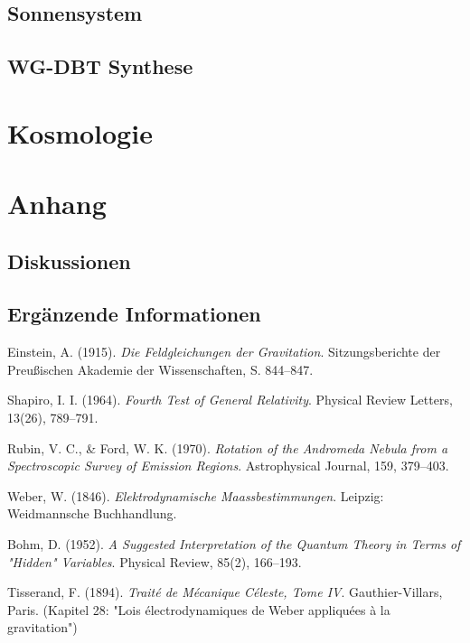 \documentclass{book}
\numberwithin{equation}{section}
\begin{document}
\chapter{Sonnensystem}
\label{chapter:sonnensystem}



\chapter{WG-DBT Synthese}

\part{Kosmologie}



\part{Anhang}
\chapter{Diskussionen}
\label{chapter:diskussion}







\chapter{Ergänzende Informationen}
\label{chapter:information}


\begin{thebibliography}{9}

Einstein, A. (1915). 
\textit{Die Feldgleichungen der Gravitation}. 
Sitzungsberichte der Preußischen Akademie der Wissenschaften, 
S. 844–847.

Shapiro, I. I. (1964). 
\textit{Fourth Test of General Relativity}. 
Physical Review Letters, 13(26), 789–791.

Rubin, V. C., \& Ford, W. K. (1970). 
\textit{Rotation of the Andromeda Nebula from a Spectroscopic Survey of Emission Regions}. 
Astrophysical Journal, 159, 379–403.

Weber, W. (1846). 
\textit{Elektrodynamische Maassbestimmungen}. 
Leipzig: Weidmannsche Buchhandlung.

Bohm, D. (1952). 
\textit{A Suggested Interpretation of the Quantum Theory in Terms of "Hidden" Variables}. 
Physical Review, 85(2), 166–193.

Tisserand, F. (1894). 
\textit{Traité de Mécanique Céleste, Tome IV}. 
Gauthier-Villars, Paris. 
(Kapitel 28: "Lois électrodynamiques de Weber appliquées à la gravitation")

\end{thebibliography}
\end{document}
